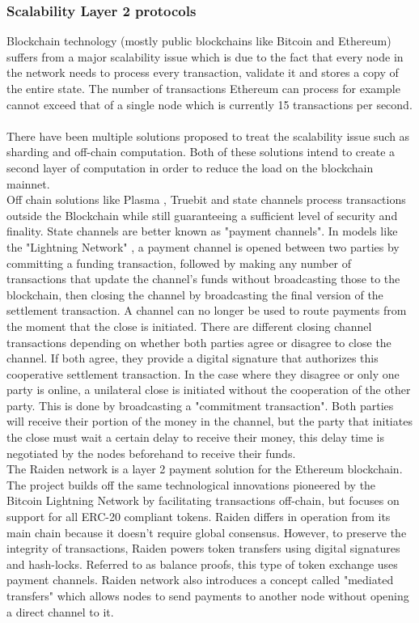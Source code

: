 \subsubsection{Scalability Layer 2 protocols}
Blockchain technology (mostly public blockchains like Bitcoin and Ethereum) suffers from a major scalability issue which is due to the fact that every node in the network needs to process every transaction, validate it and stores a copy of the entire state. The number of transactions Ethereum can process for example cannot exceed that of a single node which is currently 15 transactions per second.
\\~\\There have been multiple solutions proposed to treat the scalability issue such as sharding and off-chain computation. Both of these solutions intend to create a second layer of computation in order to reduce the load on the blockchain mainnet.
\\Off chain solutions like Plasma \cite{plasma}, Truebit \cite{truebit} and state channels process transactions outside the Blockchain while still guaranteeing a sufficient level of security and finality. State channels are better known as "payment channels". In models like the "Lightning Network" \cite{lightningnetwork}, a payment channel is opened between two parties by committing a funding transaction, followed by making any number of transactions that update the channel's funds without broadcasting those to the blockchain, then closing the channel by broadcasting the final version of the settlement transaction.
A channel can no longer be used to route payments from the moment that the close is initiated. There are different closing channel transactions depending on whether both parties agree or disagree to close the channel. If both agree, they provide a digital signature that authorizes this cooperative settlement transaction. In the case where they disagree or only one party is online, a unilateral close is initiated without the cooperation of the other party. This is done by broadcasting a "commitment transaction". Both parties will receive their portion of the money in the channel, but the party that initiates the close must wait a certain delay to receive their money, this delay time is negotiated by the nodes beforehand to receive their funds.
\\The Raiden network is a layer 2 payment solution for the Ethereum blockchain. The project builds off the same technological innovations pioneered by the Bitcoin Lightning Network by facilitating transactions off-chain, but focuses on support for all ERC-20 compliant tokens. Raiden differs in operation from its main chain because it doesn’t require global consensus. However, to preserve the integrity of transactions, Raiden powers token transfers using digital signatures and hash-locks. Referred to as balance proofs, this type of token exchange uses payment channels. Raiden network also introduces a concept called "mediated transfers" which allows nodes to send payments to another node without opening a direct channel to it.
